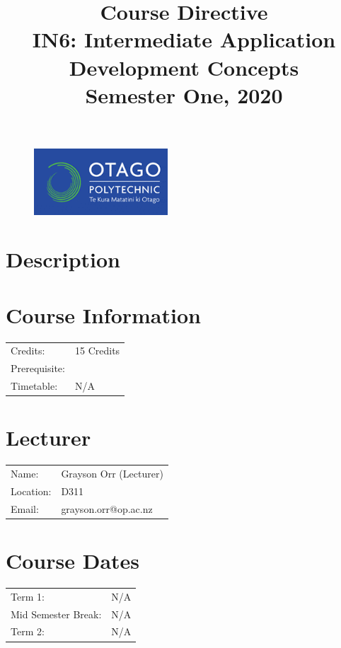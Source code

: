 \documentclass{article}
\author{}
\begin{document}
\begin{figure}
  \includegraphics[width=50mm]{../resources/img/logo.png}
\end{figure}

\title{Course Directive\\IN6: Intermediate Application Development Concepts\\Semester One, 2020}
\date{}
\maketitle

\section*{Description}

\section*{Course Information}
\begin{tabular}{ll}
  Credits:      & 15 Credits \\
  Prerequisite: &            \\
  Timetable:    & N/A        \\
\end{tabular}

\section*{Lecturer}
\begin{tabular}{ll}
  Name:     & Grayson Orr (Lecturer) \\
  Location: & D311                   \\
  Email:    & grayson.orr@op.ac.nz   \\
\end{tabular}

\section*{Course Dates}
\begin{tabular}{ll}
  Term 1:             & N/A \\
  Mid Semester Break: & N/A \\
  Term 2:             & N/A \\
\end{tabular}
\end{document}
